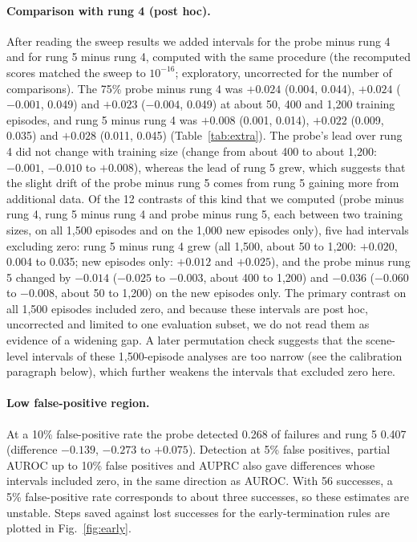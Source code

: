 \documentclass[11pt]{article}
\begin{document}
\paragraph{Comparison with rung 4 (post hoc).} After reading the sweep results we added intervals for the probe minus rung 4 and for rung 5 minus rung 4, computed with the same procedure (the recomputed scores matched the sweep to $10^{-16}$; exploratory, uncorrected for the number of comparisons). The 75\% probe minus rung 4 was $+0.024$ (0.004, 0.044), $+0.024$ ($-0.001$, 0.049) and $+0.023$ ($-0.004$, 0.049) at about 50, 400 and 1,200 training episodes, and rung 5 minus rung 4 was $+0.008$ (0.001, 0.014), $+0.022$ (0.009, 0.035) and $+0.028$ (0.011, 0.045) (Table~\ref{tab:extra}). The probe's lead over rung 4 did not change with training size (change from about 400 to about 1,200: $-0.001$, $-0.010$ to $+0.008$), whereas the lead of rung 5 grew, which suggests that the slight drift of the probe minus rung 5 comes from rung 5 gaining more from additional data. Of the 12 contrasts of this kind that we computed (probe minus rung 4, rung 5 minus rung 4 and probe minus rung 5, each between two training sizes, on all 1,500 episodes and on the 1,000 new episodes only), five had intervals excluding zero: rung 5 minus rung 4 grew (all 1,500, about 50 to 1,200: $+0.020$, 0.004 to 0.035; new episodes only: $+0.012$ and $+0.025$), and the probe minus rung 5 changed by $-0.014$ ($-0.025$ to $-0.003$, about 400 to 1,200) and $-0.036$ ($-0.060$ to $-0.008$, about 50 to 1,200) on the new episodes only. The primary contrast on all 1,500 episodes included zero, and because these intervals are post hoc, uncorrected and limited to one evaluation subset, we do not read them as evidence of a widening gap. A later permutation check suggests that the scene-level intervals of these 1,500-episode analyses are too narrow (see the calibration paragraph below), which further weakens the intervals that excluded zero here.

\paragraph{Low false-positive region.} At a 10\% false-positive rate the probe detected 0.268 of failures and rung 5 0.407 (difference $-0.139$, $-0.273$ to $+0.075$). Detection at 5\% false positives, partial AUROC up to 10\% false positives and AUPRC also gave differences whose intervals included zero, in the same direction as AUROC. With 56 successes, a 5\% false-positive rate corresponds to about three successes, so these estimates are unstable. Steps saved against lost successes for the early-termination rules are plotted in Fig.~\ref{fig:early}.
\end{document}
